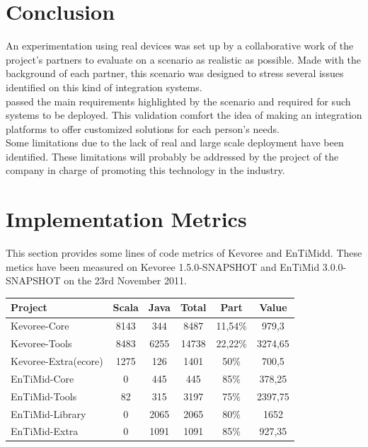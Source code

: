  

\section{Conclusion}
\label{sec:concluAAL}

An experimentation using real devices was set up by a collaborative work of the project's partners to evaluate \enti{} on a scenario as realistic as possible. Made with the background of each partner, this scenario was designed to stress several issues identified on this kind of integration systems.\\
\enti{} passed the main requirements highlighted by the scenario and required for such systems to be deployed. This validation comfort the idea of making \enti{} an integration platforms to offer customized solutions for each person's needs.\\
Some limitations due to the lack of real and large scale deployment have been identified. These limitations will probably be addressed by the project of the company in charge of promoting this technology in the industry.




\section{Implementation Metrics}

This section provides some lines of code metrics of Kevoree and EnTiMidd. These metics have been measured on Kevoree 1.5.0-SNAPSHOT and EnTiMid 3.0.0-SNAPSHOT on the 23rd November 2011.\\

\begin{tabular}{l||c|c|c|c|c}
Project & Scala & Java & Total & Part & Value \\
\hline \hline
Kevoree-Core & 8143 & 344 & 8487 & 11,54\% & 979,3 \\
Kevoree-Tools & 8483 & 6255 & 14738 & 22,22\% & 3274,65 \\
Kevoree-Extra(ecore) & 1275 & 126 & 1401 & 50\% & 700,5 \\
\hline \hline
EnTiMid-Core & 0 & 445 & 445 & 85\% & 378,25 \\
EnTiMid-Tools & 82 & 315 & 3197 & 75\% & 2397,75 \\
EnTiMid-Library & 0 & 2065 & 2065 & 80\% & 1652 \\
EnTiMid-Extra & 0 & 1091 & 1091 & 85\% & 927,35 \\
\end{tabular}\\
\\

